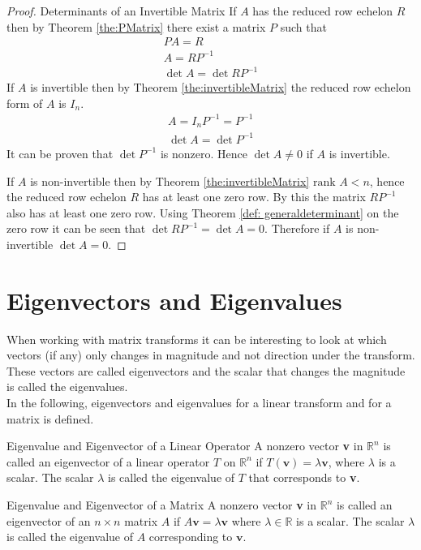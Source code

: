 \begin{proof}{Determinants of an Invertible Matrix}
    If $A$ has the reduced row echelon $R$ then by Theorem \ref{the:PMatrix} there exist a matrix $P$ such that
    \begin{align*}
        PA=R \\
        A=RP^{-1} \\
        \det A = \det RP^{-1}
    \end{align*}
    If $A$ is invertible then by Theorem \ref{the:invertibleMatrix}  the reduced row echelon form of $A$ is $I_n$. 
    \begin{align*}
        A=I_nP^{-1}=P^{-1} \\
        \det A = \det P^{-1}
    \end{align*}
    It can be proven that $\det P^{-1}$ is nonzero. Hence $\det A \neq 0$ if $A$ is invertible.
    
    If $A$ is non-invertible then by Theorem \ref{the:invertibleMatrix} $\text{rank } A < n$, hence the reduced row echelon $R$ has at least one zero row. By this the matrix $RP^{-1}$ also has at least one zero row. Using Theorem \ref{def: generaldeterminant} on the zero row it can be seen that $\det RP^{-1}=\det A=0$. Therefore if $A$ is non-invertible $\det A = 0$.
\end{proof}

\section{Eigenvectors and Eigenvalues}
When working with matrix transforms it can be interesting to look at which vectors (if any) only changes in magnitude and not direction under the transform. These vectors are called eigenvectors and the scalar that changes the magnitude is called the eigenvalues.
\\ 
In the following, eigenvectors and eigenvalues for a linear transform and for a matrix is defined.

\begin{definition}{Eigenvalue and Eigenvector of a Linear Operator}
A nonzero vector \textbf{v} in $\mathbb{R}^n$ is called an eigenvector of a linear operator $T$ on $\mathbb{R}^n$ if $T(\textbf{v})=\lambda\textbf{v}$, where $\lambda$ is a scalar. The scalar $\lambda$ is called the eigenvalue of $T$ that corresponds to \textbf{v}. 
\end{definition}

\begin{definition}{Eigenvalue and Eigenvector of a Matrix}
A nonzero vector \textbf{v} in $\mathbb{R}^n$ is called an eigenvector of an $n \times n$ matrix $A$ if $A\textbf{v}=\lambda\textbf{v}$ where $\lambda \in \mathbb{R}$ is a scalar. The scalar $\lambda$ is called the eigenvalue of $A$ corresponding to $\textbf{v}$.
\label{def:Eigenvalue_and_Eigenvector_of_a Matrix}
\end{definition}


